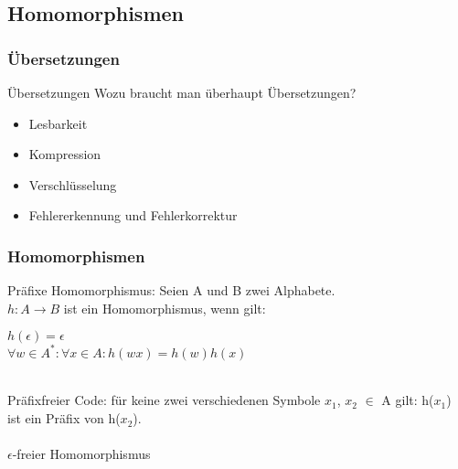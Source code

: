 \documentclass{beamer}
\begin{document}
\subsection{Homomorphismen}
\begin{frame}
	\frametitle{Übersetzungen}
	\begin{block}{Übersetzungen}
		Wozu braucht man überhaupt Übersetzungen?\\
		\pause
		\begin{itemize}
			\item Lesbarkeit
			\item Kompression
			\item Verschlüsselung
			\item Fehlererkennung und Fehlerkorrektur
		\end{itemize}
	\end{block}
\end{frame}

\begin{frame}
	\frametitle{Homomorphismen}
	\begin{block}{Präfixe}
		Homomorphismus: Seien A und B zwei Alphabete.\\
		$h: A \rightarrow B$ ist ein Homomorphismus, wenn gilt:\\
		\begin{center}
			$h(\epsilon ) = \epsilon$\\
			$\forall w \in A^*: \forall x \in A: h(wx) = h(w)h(x)$
		\end{center}\pause
		\hfill\\	
		Präfixfreier Code: für keine zwei verschiedenen Symbole 				$x_1$, $x_2$ $\in$ A gilt: h($x_1$)
		ist ein Präfix von h($x_2$).\pause
		\\
		\hfill\\
		$\epsilon$-freier Homomorphismus		
	\end{block}
\end{frame}
\end{document}
